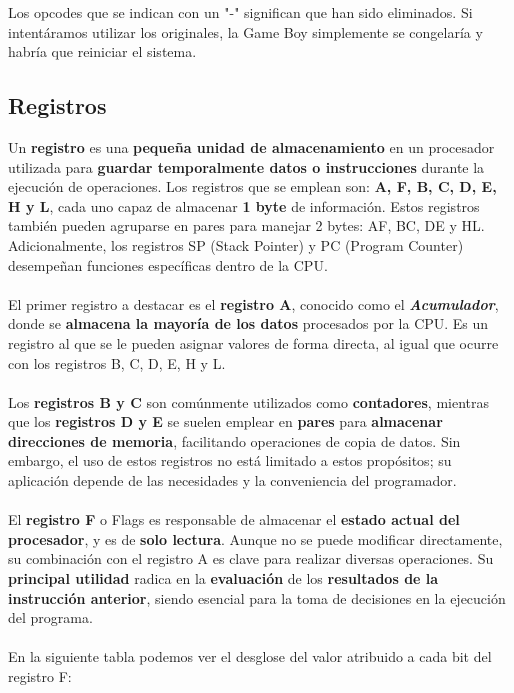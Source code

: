 Los opcodes que se indican con un "-" significan que han sido eliminados. Si intentáramos utilizar los originales, la Game Boy simplemente se congelaría y habría que reiniciar el sistema.

\subsection{Registros}

Un \textbf{registro} es una \textbf{pequeña unidad de almacenamiento} en un procesador utilizada para \textbf{guardar temporalmente datos o instrucciones} durante la ejecución de operaciones. Los registros que se emplean son: \textbf{A, F, B, C, D, E, H y L}, cada uno capaz de almacenar \textbf{1 byte} de información. Estos registros también pueden agruparse en pares para manejar 2 bytes: AF, BC, DE y HL. Adicionalmente, los registros SP (Stack Pointer) y PC (Program Counter) desempeñan funciones específicas dentro de la CPU.
\\\\
El primer registro a destacar es el \textbf{registro A}, conocido como el \textbf{\textit{Acumulador}}, donde se \textbf{almacena la mayoría de los datos} procesados por la CPU. Es un registro al que se le pueden asignar valores de forma directa, al igual que ocurre con los registros B, C, D, E, H y L.
\\\\
Los \textbf{registros B y C} son comúnmente utilizados como \textbf{contadores}, mientras que los \textbf{registros D y E} se suelen emplear en \textbf{pares} para \textbf{almacenar direcciones de memoria}, facilitando operaciones de copia de datos. Sin embargo, el uso de estos registros no está limitado a estos propósitos; su aplicación depende de las necesidades y la conveniencia del programador.
\\\\
El \textbf{registro F} o Flags es responsable de almacenar el \textbf{estado actual del procesador}, y es de \textbf{solo lectura}. Aunque no se puede modificar directamente, su combinación con el registro A es clave para realizar diversas operaciones. Su \textbf{principal utilidad} radica en la \textbf{evaluación} de los \textbf{resultados de la instrucción anterior}, siendo esencial para la toma de decisiones en la ejecución del programa.
\\\\
En la siguiente tabla podemos ver el desglose del valor atribuido a cada bit del registro F:

